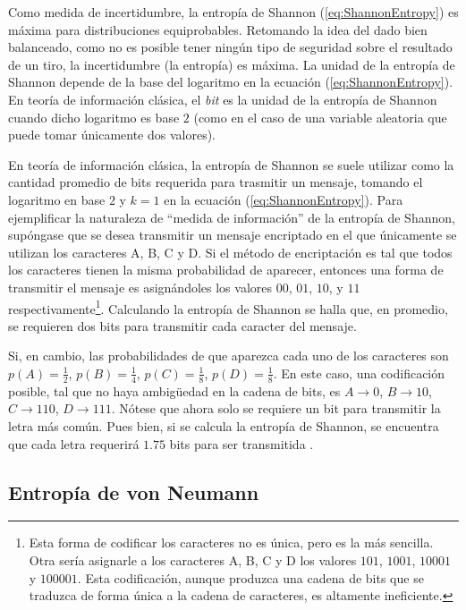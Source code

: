 Como medida de incertidumbre, la entropía de Shannon (\ref{eq:ShannonEntropy}) es máxima para distribuciones equiprobables. Retomando la idea del dado bien balanceado, como no es posible tener ningún tipo de seguridad sobre el resultado de un tiro, la incertidumbre (la entropía) es máxima. La unidad de la entropía de Shannon depende de la base del logaritmo en la ecuación (\ref{eq:ShannonEntropy}). En teoría de información clásica, el \textit{bit} es la unidad de la entropía de Shannon cuando dicho logaritmo es base $2$ (como en el caso de una variable aleatoria que puede tomar únicamente dos valores).


En teoría de información clásica, la entropía de Shannon se suele utilizar como la cantidad promedio de bits requerida para trasmitir un mensaje, tomando el logaritmo en base $2$ y $k=1$ en la ecuación (\ref{eq:ShannonEntropy}). Para ejemplificar la naturaleza de ``medida de información'' de la entropía de Shannon, supóngase que se desea transmitir un mensaje encriptado en el que únicamente se utilizan los caracteres A, B, C y D. Si el método de encriptación es tal que todos los caracteres tienen la misma probabilidad de aparecer, entonces una forma de transmitir el mensaje es asignándoles los valores $00$, $01$, $10$, y $11$ respectivamente\footnote{Esta forma de codificar los caracteres no es única, pero es la más sencilla. Otra sería asignarle a los caracteres A, B, C y D los valores $101$, $1001$, $10001$ y $100001$. Esta codificación, aunque produzca una cadena de bits que se traduzca de forma única a la cadena de caracteres, es altamente ineficiente. }. Calculando la entropía de Shannon se halla que, en promedio, se requieren dos bits para transmitir cada caracter del mensaje. 

Si, en cambio, las probabilidades de que aparezca cada uno de los caracteres son $p(A)=\frac{1}{2}$, $p(B)=\frac{1}{4}$, $p(C)=\frac{1}{8}$, $p(D)=\frac{1}{8}$. En este caso, una codificación posible, tal que no haya ambigüedad en la cadena de bits, es $A \rightarrow 0$, $B\rightarrow 10$, $C\rightarrow 110$, $D\rightarrow 111$. Nótese que ahora solo se requiere un bit para transmitir la letra más común. Pues bien, si se calcula la entropía de Shannon, se encuentra que cada letra requerirá $1.75$ bits para ser transmitida \cite{Cryptography}.

\subsection{Entropía de von Neumann}


